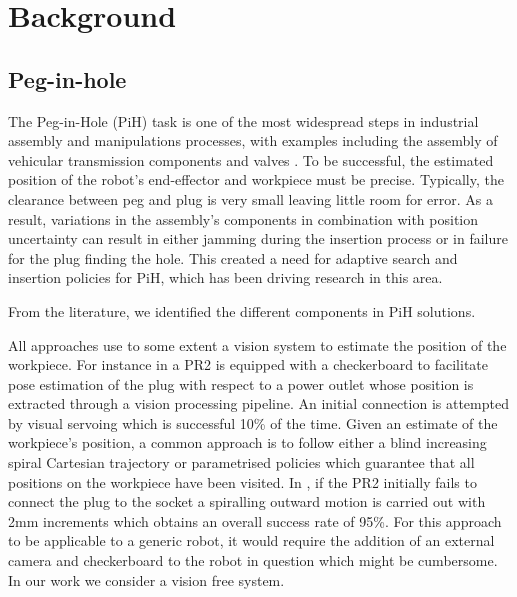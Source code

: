 \section{Background}\label{ch4:background}

\subsection{Peg-in-hole}

The Peg-in-Hole (PiH) task is one of the most widespread steps in industrial assembly and manipulations processes, with 
examples including the assembly of vehicular transmission components \cite{search_strategies_icra_2001} and 
valves \cite{online_gpr_icra_2014}. To be successful, the estimated
position of the robot's end-effector and workpiece must be precise. Typically, the clearance between peg and plug 
is very small leaving little room for error. As a result, variations in the assembly's components 
in combination with position uncertainty can result in either jamming during the insertion process or in failure for 
the plug finding the hole. This created a need for adaptive search and insertion policies for PiH, which has been driving research 
in this area. 

From the literature, we identified the different components in PiH solutions. 

All approaches use to some extent a vision system to estimate the position of the workpiece. 
For instance in \cite{peg_personal_icra_2010} a PR2 is equipped with a checkerboard to facilitate pose 
estimation  of the plug with respect to a power outlet whose position is extracted through a vision 
processing pipeline. An initial connection is attempted by visual servoing which is successful 10\% of the 
time. Given an estimate of the workpiece's position, a common approach is to follow either a blind increasing spiral 
Cartesian trajectory or parametrised policies which guarantee that all positions on the workpiece have been visited.
In \cite{peg_personal_icra_2010}, if the PR2 initially fails to connect the plug to the socket
a spiralling outward motion is carried out with 2mm increments which obtains an overall 
success rate of 95\%. For this approach to be applicable to a generic robot, it would require the addition of an
external camera and checkerboard to the robot in question which might be cumbersome. In our work we consider a 
vision free system.

